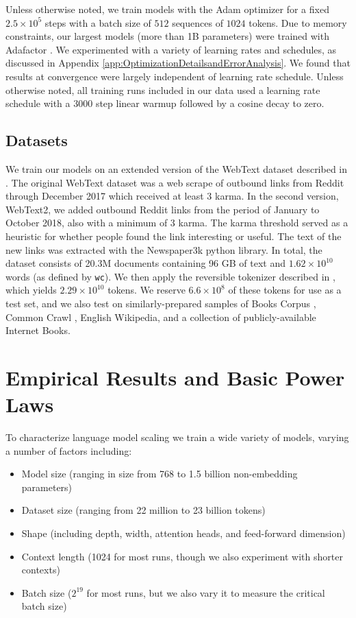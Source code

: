 \documentclass[english]{article}
\renewcommand{\arraystretch}{1.5}
\begin{document}
Unless otherwise noted, we train  models with the Adam optimizer \cite{kingma2014adam} for a fixed $2.5 \times 10^5$  steps with a batch size of $512$ sequences of $1024$ tokens.
Due to memory constraints, our largest models (more than 1B parameters) were trained with Adafactor \cite{DBLP:journals/corr/abs-1804-04235}.
We experimented with a variety of learning rates and schedules, as discussed in Appendix \ref{app:OptimizationDetailsandErrorAnalysis}.
We found that results at convergence were largely independent of learning rate schedule.  Unless otherwise noted, all training runs included in our data used a learning rate schedule with a 3000 step linear warmup followed by a cosine decay to zero.

\subsection{Datasets}
We train our models on an extended version of the WebText dataset described in \cite{radford2019language}.  The original WebText dataset was a web scrape of outbound links from Reddit through December 2017 which received at least 3 karma. In the second version, WebText2, we added outbound Reddit links from the period of January to October 2018, also with a minimum of 3 karma. The karma threshold served as a heuristic for whether people found the link interesting or useful. The text of the new links was extracted with the Newspaper3k python library. In total, the dataset consists of 20.3M documents containing 96 GB of text and $1.62 \times 10^{10}$ words (as defined by \texttt{wc}). We then apply the reversible tokenizer described in \cite{radford2019language}, which yields $2.29 \times 10^{10}$ tokens.  We reserve $6.6 \times 10^{8}$ of these tokens for use as a test set, and we also test on similarly-prepared samples of Books Corpus \cite{Zhu_2015}, Common Crawl \cite{commoncrawl}, English Wikipedia, and a collection of publicly-available Internet Books.



\section{Empirical Results and Basic Power Laws}
\label{sec:Empirical}

To characterize language model scaling we train a wide variety of models, varying a number of factors including:
\begingroup
\renewcommand{\arraystretch}{1.1}
\begin{itemize}
\item Model size (ranging in size from 768 to 1.5 billion non-embedding parameters)
\item Dataset size (ranging from 22 million to 23 billion tokens)
\item Shape (including depth, width, attention heads, and feed-forward dimension)
\item Context length (1024 for most runs, though we also experiment with shorter contexts)
\item Batch size ($2^{19}$ for most runs, but we also vary it to measure the critical batch size)
\end{itemize}
\endgroup
\end{document}
